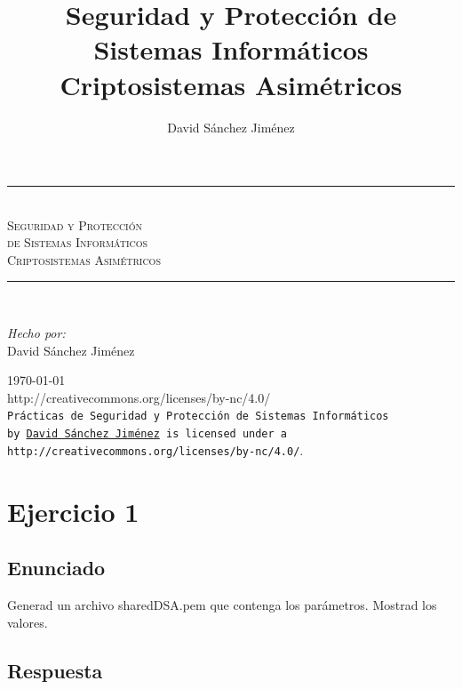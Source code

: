 \documentclass[10pt,a4paper,spanish]{report}
\title{Seguridad y Protección de Sistemas Informáticos \\
Criptosistemas Asimétricos}
\author{David Sánchez Jiménez}
\newcommand{\HRule}{\rule{\linewidth}{0.5mm}} %
\begin{document}
\begin{titlepage}
 \begin{center}
  \HRule \\[0.8cm]
  \textsc{\huge Seguridad y Protección \\ de Sistemas Informáticos \\[0.5cm] Criptosistemas Asimétricos}\\[1.6cm]
  \HRule \\[1cm]
  \begin{flushleft}
   \emph{Hecho por:}\\
   David Sánchez Jiménez
  \end{flushleft}
  \vspace{12cm}
  \large{\today}\\
  \vspace{0.5cm}
  {http://creativecommons.org/licenses/by-nc/4.0/}\\[0.5cm]
  \texttt{Prácticas de Seguridad y Protección de Sistemas Informáticos\\ by
   \href{mailto:dasaji92@gmail.com}{David Sánchez Jiménez} is licensed under a 
   {http://creativecommons.org/licenses/by-nc/4.0/}}.\\[3mm]
 \end{center}
\end{titlepage}

\tableofcontents
\newpage

\chapter{Ejercicio 1}

\section{Enunciado}
\noindent
Generad un archivo sharedDSA.pem que contenga los parámetros. Mostrad los valores.

\section{Respuesta}
\noindent
\end{document}
